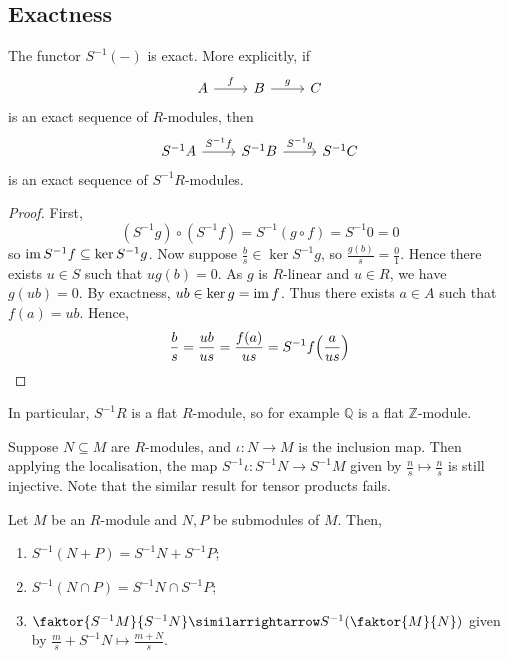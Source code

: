 \subsection{Exactness}
\begin{proposition}
    The functor \( S^{-1}(-) \) is exact.
    More explicitly, if
\[\begin{tikzcd}
	A & B & C
	\arrow["f", from=1-1, to=1-2]
	\arrow["g", from=1-2, to=1-3]
\end{tikzcd}\]
    is an exact sequence of \( R \)-modules, then
\[\begin{tikzcd}
	{S^{-1}A} & {S^{-1}B} & {S^{-1}C}
	\arrow["{S^{-1}f}", from=1-1, to=1-2]
	\arrow["{S^{-1}g}", from=1-2, to=1-3]
\end{tikzcd}\]
    is an exact sequence of \( S^{-1}R \)-modules.
\end{proposition}
\begin{proof}
    First,
    \[ (S^{-1}g) \circ (S^{-1}f) = S^{-1}(g \circ f) = S^{-1}0 = 0 \]
    so \( \operatorname{im} S^{-1}f \subseteq \ker S^{-1}g \).
    Now suppose \( \frac{b}{s} \in \ker S^{-1}g \), so \( \frac{g(b)}{s} = \frac{0}{1} \).
    Hence there exists \( u \in S \) such that \( ug(b) = 0 \).
    As \( g \) is \( R \)-linear and \( u \in R \), we have \( g(ub) = 0 \).
    By exactness, \( ub \in \ker g = \operatorname{im} f \).
    Thus there exists \( a \in A \) such that \( f(a) = ub \).
    Hence,
    \[ \frac{b}{s} = \frac{ub}{us} = \frac{f(a)}{us} = S^{-1}f\qty(\frac{a}{us}) \]
\end{proof}
In particular, \( S^{-1}R \) is a flat \( R \)-module, so for example \( \mathbb Q \) is a flat \( \mathbb Z \)-module.
\begin{remark}
    Suppose \( N \subseteq M \) are \( R \)-modules, and \( \iota : N \to M \) is the inclusion map.
    Then applying the localisation, the map \( S^{-1}\iota : S^{-1}N \to S^{-1}M \) given by \( \frac{n}{s} \mapsto \frac{n}{s} \) is still injective.
    Note that the similar result for tensor products fails.
\end{remark}
\begin{proposition}
    Let \( M \) be an \( R \)-module and \( N, P \) be submodules of \( M \).
    Then,
    \begin{enumerate}
        \item \( S^{-1}(N + P) = S^{-1}N + S^{-1}P \);
        \item \( S^{-1}(N \cap P) = S^{-1}N \cap S^{-1}P \);
        \item \( \faktor{S^{-1}M}{S^{-1}N} \similarrightarrow S^{-1}\qty(\faktor{M}{N}) \) given by \( \frac{m}{s} + S^{-1}N \mapsto \frac{m + N}{s} \).
    \end{enumerate}
\end{proposition}
